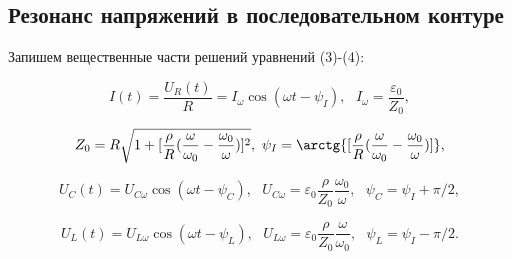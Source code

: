 \documentclass[a4paper,12pt]{article} %
\begin{document}
\subsection{Резонанс напряжений в последовательном контуре}
\hfill \break Запишем вещественные части решений уравнений (3)-(4):

\begin{equation}\label{ linkname }
I(t) = \frac{U_{R}(t)}{R} = I_{\omega}\cos{(\omega t - \psi_{I})}, \text{ } I_{\omega} = \frac{\varepsilon_{0}}{Z_{0}},
\end{equation}

\begin{equation}\label{ linkname }
Z_{0} = R\sqrt{1 + [\frac{\rho}{R}(\frac{\omega}{\omega_{0}} - \frac{\omega_{0}}{\omega})]^2}, \text{ } \psi_{I} = \arctg{[\frac{\rho}{R}(\frac{\omega}{\omega_{0}} - \frac{\omega_{0}}{\omega})]},
\end{equation}

\begin{equation}\label{ linkname }
U_{C}(t) = U_{C\omega}\cos{(\omega t - \psi_{C})}, \text{ } U_{C\omega} = \varepsilon_{0}\frac{\rho}{Z_{0}}\frac{\omega_{0}}{\omega}, \text{ } \psi_{C} = \psi_{I} + \pi/2,
\end{equation}

\begin{equation}\label{ linkname }
U_{L}(t) = U_{L\omega}\cos{(\omega t - \psi_{L})}, \text{ } U_{L\omega} = \varepsilon_{0}\frac{\rho}{Z_{0}}\frac{\omega}{\omega_{0}}, \text{ } \psi_{L} = \psi_{I} - \pi/2.
\end{equation}
\end{document}
